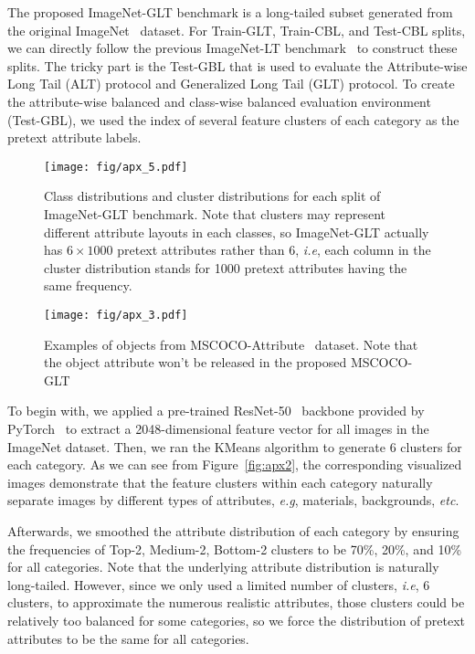 \documentclass{article}
\def\eg{\emph{e.g}} \def\Eg{\emph{E.g}}
\def\ie{\emph{i.e}} \def\Ie{\emph{I.e}}
\def\etc{\emph{etc}} \def\vs{\emph{vs}}
\begin{document}
The proposed ImageNet-GLT benchmark is a long-tailed subset generated from the original ImageNet~\cite{russakovsky2015imagenet} dataset. For Train-GLT, Train-CBL, and Test-CBL splits, we can directly follow the previous ImageNet-LT benchmark~\cite{liu2019large} to construct these splits. The tricky part is the Test-GBL that is used to evaluate the Attribute-wise Long Tail (ALT) protocol and Generalized Long Tail (GLT) protocol. To create the attribute-wise balanced and class-wise balanced evaluation environment (Test-GBL), we used the index of several feature clusters of each category as the pretext attribute labels. 


\begin{figure}
   \begin{minipage}[b]{1.0\linewidth}
   \centerline{\texttt{[image: fig/apx\_5.pdf]}}
   \end{minipage}
   \caption{Class distributions and cluster distributions for each split of ImageNet-GLT benchmark. Note that clusters may represent different attribute layouts in each classes, so ImageNet-GLT actually has $6 \times 1000$ pretext attributes rather than 6, \ie, each column in the cluster distribution stands for 1000 pretext attributes having the same frequency.}
   \label{fig:apx5} \end{figure}

\begin{figure}
   \begin{minipage}[b]{1.0\linewidth}
   \centerline{\texttt{[image: fig/apx\_3.pdf]}}
   \end{minipage}
   \caption{Examples of objects from MSCOCO-Attribute~\cite{patterson2016coco} dataset. Note that the object attribute won't be released in the proposed MSCOCO-GLT}
   \label{fig:axp3} \end{figure}


To begin with, we applied a pre-trained ResNet-50~\cite{he2016deep} backbone provided by PyTorch~\cite{NEURIPS2019_9015} to extract a 2048-dimensional feature vector for all images in the ImageNet dataset. Then, we ran the KMeans algorithm to generate 6 clusters for each category. As we can see from Figure~\ref{fig:apx2}, the corresponding visualized images demonstrate that the feature clusters within each category naturally separate images by different types of attributes, \eg, materials, backgrounds, \etc.

Afterwards, we smoothed the attribute distribution of each category by ensuring the frequencies of Top-2, Medium-2, Bottom-2 clusters to be 70\%, 20\%, and 10\% for all categories. Note that the underlying attribute distribution is naturally long-tailed. However, since we only used a limited number of clusters, \ie, 6 clusters, to approximate the numerous realistic attributes, those clusters could be relatively too balanced for some categories, so we force the distribution of pretext attributes to be the same for all categories. 
\end{document}
